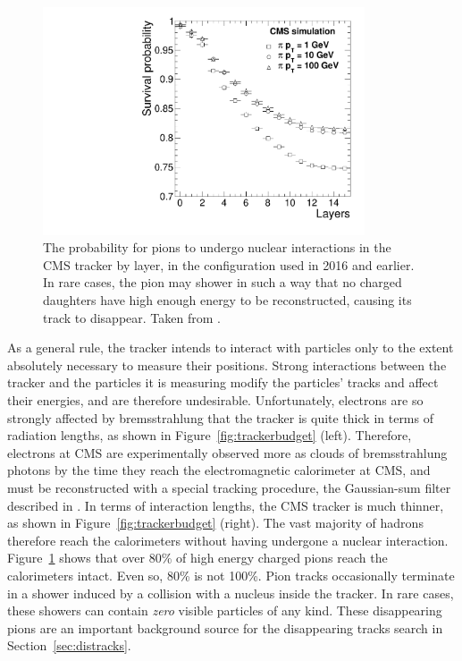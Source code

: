   \begin{figure}[h!]
    \centering
    \includegraphics[width=0.85\textwidth]{figures/PionSurvivalProbability.pdf}
    \caption[Pion survival in the tracker.]{
      The probability for pions to undergo nuclear interactions in the CMS tracker by layer, in the configuration used in 2016 and earlier. 
      In rare cases, the pion may shower in such a way that no charged daughters have high enough energy to be reconstructed, causing its track to disappear.
      Taken from \cite{cmstracking}.}
    \label{fig:pionsurvival}
  \end{figure}  

  As a general rule, the tracker intends to interact with particles only to the extent absolutely necessary to measure their positions.
  Strong interactions between the tracker and the particles it is measuring modify the particles' tracks and affect their energies, and are therefore undesirable.
  Unfortunately, electrons are so strongly affected by bremsstrahlung that the tracker is quite thick in terms of radiation lengths, as shown in Figure~\ref{fig:trackerbudget} (left).
  Therefore, electrons at CMS are experimentally observed more as clouds of bremsstrahlung photons by the time they reach the electromagnetic calorimeter at CMS, and must be reconstructed with a special tracking procedure, the Gaussian-sum filter described in \cite{gsftracking}.
  In terms of interaction lengths, the CMS tracker is much thinner, as shown in Figure~\ref{fig:trackerbudget} (right).
  The vast majority of hadrons therefore reach the calorimeters without having undergone a nuclear interaction.
  Figure~\ref{fig:pionsurvival} shows that over 80\% of high energy charged pions reach the calorimeters intact.
  Even so, 80\% is not 100\%.
  Pion tracks occasionally terminate in a shower induced by a collision with a nucleus inside the tracker.
  In rare cases, these showers can contain {\it zero} visible particles of any kind.
  These disappearing pions are an important background source for the disappearing tracks search in Section~\ref{sec:distracks}.

